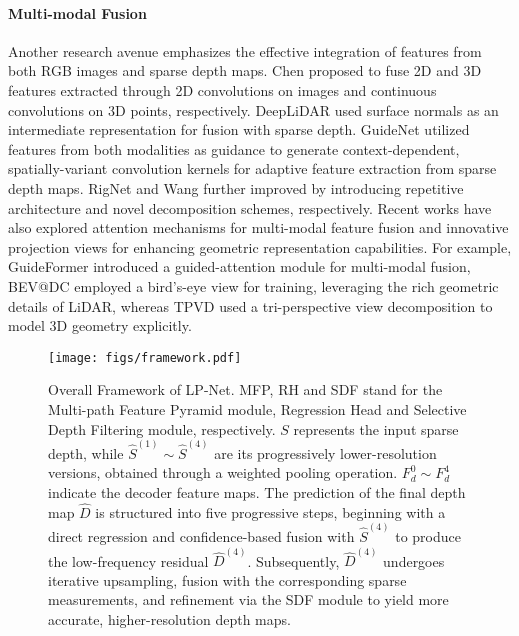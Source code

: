 \paragraph{Multi-modal Fusion}
Another research avenue emphasizes the effective integration of features from both RGB images and sparse depth maps. Chen \etal \cite{chen2019learning} proposed to fuse 2D and 3D features extracted through 2D convolutions on images and continuous convolutions on 3D points, respectively. DeepLiDAR \cite{deeplidar} used surface normals as an intermediate representation for fusion with sparse depth. GuideNet \cite{guidenet} utilized features from both modalities as guidance to generate context-dependent, spatially-variant convolution kernels for adaptive feature extraction from sparse depth maps. RigNet \cite{rignet} and Wang \etal \cite{wang2023decomposed} further improved \cite{guidenet} by introducing repetitive architecture and novel decomposition schemes, respectively. Recent works have also explored attention mechanisms for multi-modal feature fusion and innovative projection views for enhancing geometric representation capabilities. For example, GuideFormer \cite{guideformer} introduced a guided-attention module for multi-modal fusion, BEV@DC \cite{bev_dc} employed a bird's-eye view for training, leveraging the rich geometric details of LiDAR, whereas TPVD \cite{tpvd} used a tri-perspective view decomposition to model 3D geometry explicitly.

\begin{figure*}
    \centering
    \texttt{[image: figs/framework.pdf]}
    \caption{Overall Framework of LP-Net. MFP, RH and SDF stand for the Multi-path Feature Pyramid module, Regression Head and Selective Depth Filtering module, respectively. $S$ represents the input sparse depth, while $\hat{S}^{(1)}\sim \hat{S}^{(4)}$ are its progressively lower-resolution versions, obtained through a weighted pooling operation. $F_{d}^{0}\sim F_{d}^{4}$ indicate the decoder feature maps. The prediction of the final depth map $\hat{D}$ is structured into five progressive steps, beginning with a direct regression and confidence-based fusion with $\hat{S}^{(4)}$ to produce the low-frequency residual $\hat{D}^{(4)}$. Subsequently, $\hat{D}^{(4)}$ undergoes iterative upsampling, fusion with the corresponding sparse measurements, and refinement via the SDF module to yield more accurate, higher-resolution depth maps.}
    \label{fig.framework}
\end{figure*} 

